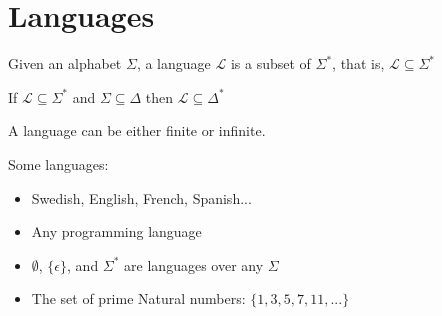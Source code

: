 \section{Languages} %
\label{sec:languages}
\begin{Def}
    Given an alphabet $\Sigma$, a {\color{red} language} $\mathcal{L}$ is a subset of $\Sigma^*$, that is, $\mathcal{L} \subseteq \Sigma^*$
\end{Def}
\begin{Rem}
    If $\mathcal{L} \subseteq \Sigma^*$ and $\Sigma \subseteq \Delta$ then $\mathcal{L} \subseteq \Delta^*$
\end{Rem}
\begin{Rem}
    A language can be either finite or infinite.
\end{Rem}
\begin{Ex}
    Some languages:
    \begin{itemize}
        \item Swedish, English, French, Spanish...
        \item Any programming language
        \item $\emptyset$, $\{\epsilon\}$, and $\Sigma^*$ are languages over any $\Sigma$
        \item The set of prime Natural numbers: $\{1,3,5,7,11,...\}$
    \end{itemize}
\end{Ex}

